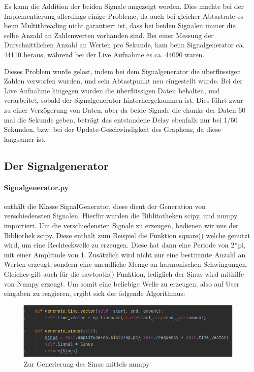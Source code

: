 \documentclass{article}
\begin{document}
Es kann die Addition der beiden Signale angezeigt werden. Dies machte bei der Implementierung allerdings einige Probleme, da auch bei gleicher Abtastrate es beim Multithreading nicht garantiert ist, dass bei beiden Signalen immer die selbe Anzahl an Zahlenwerten vorhanden sind. Bei einer Messung der Durschnittlichen Anzahl an Werten pro Sekunde, kam beim Signalgenerator ca. 44110 heraus, während bei der Live Aufnahme es ca. 44090 waren.

Dieses Problem wurde gelöst, indem bei dem Signalgenerator die überflüssigen Zahlen verworfen wurden, und sein Abtastpunkt neu eingestellt wurde. Bei der Live Aufnahme hingegen wurden die überflüssigen Daten behalten, und verarbeitet, sobald der Signalgenerator hinterhergekommen ist. Dies führt zwar zu einer Verzögerung von Daten, aber da beide Signale die chunks der Daten 60 mal die Sekunde geben, beträgt das entstandene Delay ebenfalls nur bei 1/60 Sekunden, bzw. bei der Update-Geschwindigkeit des Graphens, da diese langsamer ist.
\subsection{Der Signalgenerator}
\paragraph{Signalgenerator.py}
enthält die Klasse SignalGenerator, diese dient der Generation von verschiedensten Signalen. Hierfür wurden die Biblitotheken scipy, und numpy importiert. Um die verschiedensten Signale zu erzeugen, bedienen wir uns der Bibliothek scipy. Diese enthält zum Beispiel die Funktion square() welche genutzt wird, um eine Rechteckwelle zu erzeugen. Diese hat dann eine Periode von 2*pi, mit einer Amplitude von 1. Zusätzlich wird nicht nur eine bestimmte Anzahl an Werten erzeugt, sondern eine unendliche Menge an harmonischen Schwingungen. Gleiches gilt auch für die sawtooth() Funktion, lediglich der Sinus wird mithilfe von Numpy erzeugt. Um somit eine beliebige Welle zu erzeugen, also auf User eingaben zu reagieren, ergibt sich der folgende Algorithmus:

\begin{figure}[H]
  \includegraphics[width=\textwidth]{"GenerateSawTooth"}
  \caption[\textbf{GenerateSawTooth.PNG},  Quelle: Screenshot eigener Code]{Zur Generierung des Sinus mittels numpy}
\end{figure}
\end{document}
